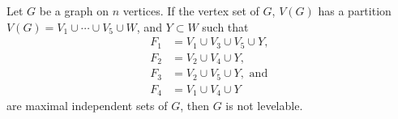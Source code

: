 \begin{theorem} \label{thm:graph-partitions}
Let $G$ be a graph on $n$ vertices. If the vertex set of $G$, $V(G)$ has a partition $V(G) = V_1 \cup  \cdots \cup  V_5 \cup W$, and $Y \subset W$ such that 
\begin{equation} \label{eq:graph-partitions}
\begin{aligned}
F_1 &= V_1 \cup V_3 \cup V_5 \cup Y,\\
F_2 &= V_2 \cup V_4 \cup Y,\\
F_3 &= V_2 \cup V_5 \cup Y, \textrm{ and }\\
F_4 &= V_1 \cup V_4 \cup Y
\end{aligned}
\end{equation}
are maximal independent sets of $G$, then $G$ is not levelable.
\end{theorem}

